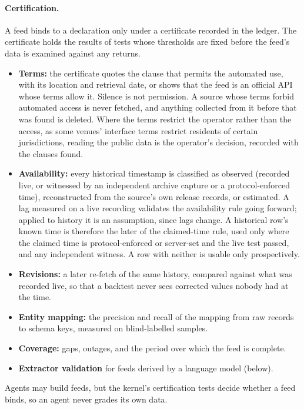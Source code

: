 \documentclass[11pt]{article}
\begin{document}
\paragraph{Certification.} A feed binds to a declaration only under a certificate recorded in the ledger. The certificate holds the results of tests whose thresholds are fixed before the feed's data is examined against any returns.
\begin{itemize}
  \item \textbf{Terms:} the certificate quotes the clause that permits the automated use, with its location and retrieval date, or shows that the feed is an official API whose terms allow it. Silence is not permission. A source whose terms forbid automated access is never fetched, and anything collected from it before that was found is deleted. Where the terms restrict the operator rather than the access, as some venues' interface terms restrict residents of certain jurisdictions, reading the public data is the operator's decision, recorded with the clauses found.
  \item \textbf{Availability:} every historical timestamp is classified as observed (recorded live, or witnessed by an independent archive capture or a protocol-enforced time), reconstructed from the source's own release records, or estimated. A lag measured on a live recording validates the availability rule going forward; applied to history it is an assumption, since lags change. A historical row's known time is therefore the later of the claimed-time rule, used only where the claimed time is protocol-enforced or server-set and the live test passed, and any independent witness. A row with neither is usable only prospectively.
  \item \textbf{Revisions:} a later re-fetch of the same history, compared against what was recorded live, so that a backtest never sees corrected values nobody had at the time.
  \item \textbf{Entity mapping:} the precision and recall of the mapping from raw records to schema keys, measured on blind-labelled samples.
  \item \textbf{Coverage:} gaps, outages, and the period over which the feed is complete.
  \item \textbf{Extractor validation} for feeds derived by a language model (below).
\end{itemize}
Agents may build feeds, but the kernel's certification tests decide whether a feed binds, so an agent never grades its own data.
\end{document}
